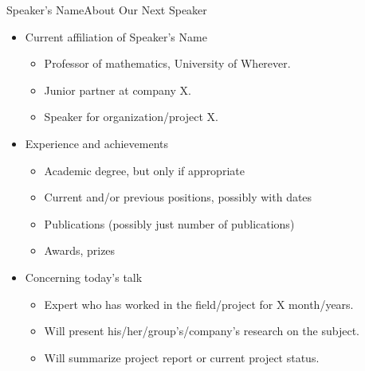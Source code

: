 \documentclass{beamer}
\begin{document}
\begin{frame}{Speaker's Name}{About Our Next Speaker}

  \begin{itemize}
  \item
    Current affiliation of Speaker's Name

    \begin{itemize}
    \item
      Professor of mathematics, University of Wherever.
    \item
      Junior partner at company X.
    \item
      Speaker for organization/project X.
    \end{itemize}
  \item
    Experience and achievements

    \begin{itemize}
    \item
      Academic degree, but only if appropriate
    \item
      Current and/or previous positions, possibly with dates
    \item
      Publications (possibly just number of publications)
    \item
      Awards, prizes
    \end{itemize}
  \item
    Concerning today's talk

    \begin{itemize}
    \item
      Expert who has worked in the field/project for X month/years.
    \item
      Will present his/her/group's/company's research on the subject.
    \item
      Will summarize project report or current project status.
    \end{itemize}
  \end{itemize}  
\end{frame}
\end{document}
